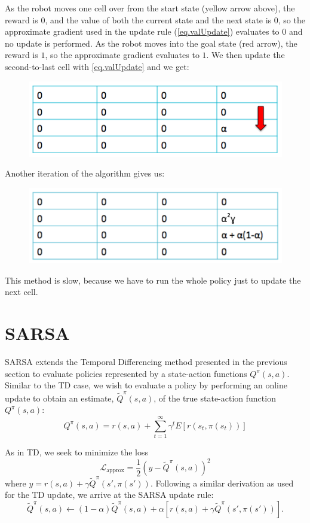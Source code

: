 \documentclass[11pt]{article}
\numberwithin{equation}{section}
\numberwithin{figure}{section}
\begin{document}
As the robot moves one cell over from the start state (yellow arrow above), the reward is $0$, and the value of both the current state and the next state is $0$, so the approximate gradient used in the update rule (\cref{eq.valUpdate}) evaluates to $0$ and no update is performed. As the robot moves into the goal state (red arrow), the reward is $1$, so the approximate gradient evaluates to $1$.  We then update the second-to-last cell with \cref{eq.valUpdate} and we get:

\begin{figure}[h!]
	\centering
	\includegraphics[width=.4\columnwidth]{./images/fig3}
	\label{fig.fig3}
\end{figure}

Another iteration of the algorithm gives us:

\begin{figure}[h!]
	\centering
	\includegraphics[width=.4\columnwidth]{./images/fig4new}
	\label{fig.fig4}
\end{figure}

This method is slow, because we have to run the whole policy just to update the next cell.  

\section{SARSA}
SARSA extends the Temporal Differencing method presented in the previous
section to evaluate policies represented by a state-action functions
$Q^\pi(s,a)$. Similar to the TD case, we wish to evaluate a policy by
performing an online update to obtain an estimate, $\tilde{Q}^\pi(s,a)$, of the
true state-action function $Q^\pi(s,a)$:
\begin{equation}
	Q^\pi(s,a) = r(s,a) + \sum_{t = 1}^\infty \gamma^t E[r(s_t,\pi(s_t))]
	\label{eq.sarsaEval}
\end{equation}

As in TD, we seek to minimize the loss
\begin{equation}
	\mathcal{L}_\text{approx} = \frac{1}{2} \left(y - \tilde{Q}^\pi(s,a) \right)^2
	\label{eq.sarsaLoss}
\end{equation}
where $y = r(s,a) + \gamma \tilde{Q}^\pi(s',\pi(s'))$. Following a similar
derivation as used for the TD update, we arrive at the SARSA update rule:
\begin{equation}
    \tilde{Q}^\pi(s,a) \leftarrow  (1 - \alpha) \tilde{Q}^\pi(s,a)
        + \alpha \left[ r(s,a) + \gamma \tilde{Q}^\pi(s',\pi(s')) \right].
	\label{eq.sarsaUpdate}
\end{equation}
\end{document}
